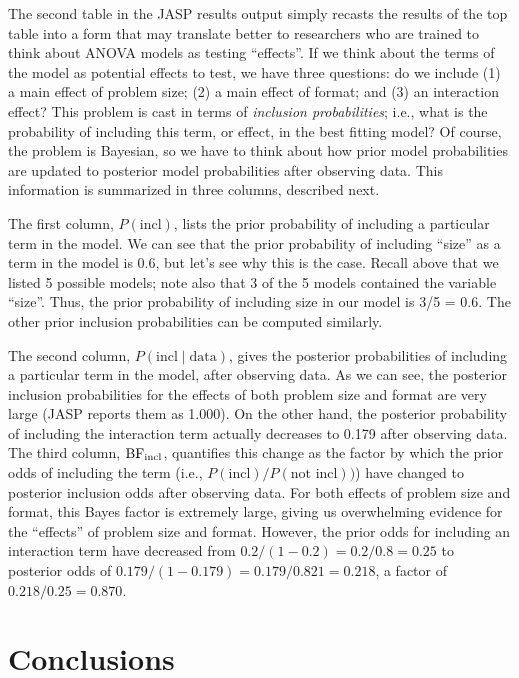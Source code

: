 \documentclass[english,,doc,floatsintext]{apa6}
\begin{document}
The second table in the JASP results output simply recasts the results of the top table into a form that may translate better to researchers who are trained to think about ANOVA models as testing \enquote{effects}. If we think about the terms of the model as potential effects to test, we have three questions: do we include (1) a main effect of problem size; (2) a main effect of format; and (3) an interaction effect? This problem is cast in terms of \emph{inclusion probabilities}; i.e., what is the probability of including this term, or effect, in the best fitting model? Of course, the problem is Bayesian, so we have to think about how prior model probabilities are updated to posterior model probabilities after observing data. This information is summarized in three columns, described next.

The first column, \(P(\text{incl})\), lists the prior probability of including a particular term in the model. We can see that the prior probability of including \enquote{size} as a term in the model is 0.6, but let's see why this is the case. Recall above that we listed 5 possible models; note also that 3 of the 5 models contained the variable \enquote{size}. Thus, the prior probability of including size in our model is 3/5 = 0.6. The other prior inclusion probabilities can be computed similarly.

The second column, \(P(\text{incl}\mid\text{data})\), gives the posterior probabilities of including a particular term in the model, after observing data. As we can see, the posterior inclusion probabilities for the effects of both problem size and format are very large (JASP reports them as 1.000). On the other hand, the posterior probability of including the interaction term actually decreases to 0.179 after observing data. The third column, \(\textnormal{BF}_{\text{incl}}\), quantifies this change as the factor by which the prior odds of including the term (i.e., \(P(\text{incl})/P(\text{not incl}))\)) have changed to posterior inclusion odds after observing data. For both effects of problem size and format, this Bayes factor is extremely large, giving us overwhelming evidence for the \enquote{effects} of problem size and format. However, the prior odds for including an interaction term have decreased from \(0.2/(1-0.2) = 0.2/0.8 = 0.25\) to posterior odds of \(0.179/(1-0.179) = 0.179/0.821 = 0.218\), a factor of \(0.218/0.25 = 0.870\).

\hypertarget{conclusions}{%
\section{Conclusions}\label{conclusions}}
\end{document}
